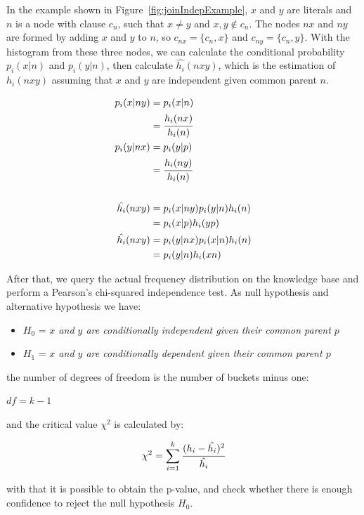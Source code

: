 In the example shown in Figure~\ref{fig:joinIndepExample}, $x$ and $y$ are literals and $n$ is a node with clause
$c_n$,
such that $x \neq y$ and $x,y \not \in c_n$. The nodes $nx$ and $ny$ are formed by adding $x$ and $y$ to $n$, so
$c_{nx}=\{c_n,x\}$ and $c_{ny}=\{c_n,y\}$. With the histogram from these three nodes, we can calculate the conditional
probability $p_i(x|n)$ and $p_i(y|n)$, then calculate $\hat{h_i}(nxy)$, which is the estimation of
$h_i(nxy)$ assuming that $x$ and $y$ are independent given common parent $n$.

\begin{align*}
 p_i(x|ny) &= p_i(x|n) \\ 
 &= \cfrac{h_i(nx)}{h_i(n)} \\ 
 p_i(y|nx) &= p_i(y|p) \\ 
 &= \cfrac{h_i(ny)}{h_i(n)} \\ \\ 
 \hat{h_i}(nxy) &= p_i(x|ny)p_i(y|n)h_i(n) \\ 
 &= p_i(x|p)h_i(yp) \\ 
 \hat{h_i}(nxy) &= p_i(y|nx)p_i(x|n)h_i(n) \\ 
 &= p_i(y|n)h_i(xn)
\label{eq:condindep}
\end{align*}

After that, we query the actual frequency distribution on the knowledge base and perform a Pearson's chi-squared
independence test. As null hypothesis and alternative hypothesis we have:

\begin{itemize}
 \item $H_0$ = \emph{$x$ and $y$ are conditionally independent given their common parent $p$}
 \item $H_1$ = \emph{$x$ and $y$ are conditionally dependent given their common parent $p$} 
\end{itemize}

the number of degrees of freedom is the number of buckets minus one:

\begin{center}
 $df=k-1$
\end{center}

and the critical value $\chi^2$ is calculated by:

\begin{equation}
 \chi^2=\sum_{i=1}^{k} \cfrac{(h_i - \hat{h_i})^2}{\hat{h_i}}
\end{equation}

with that it is possible to obtain the p-value, and check whether there is enough confidence to reject the null
hypothesis $H_0$. 

